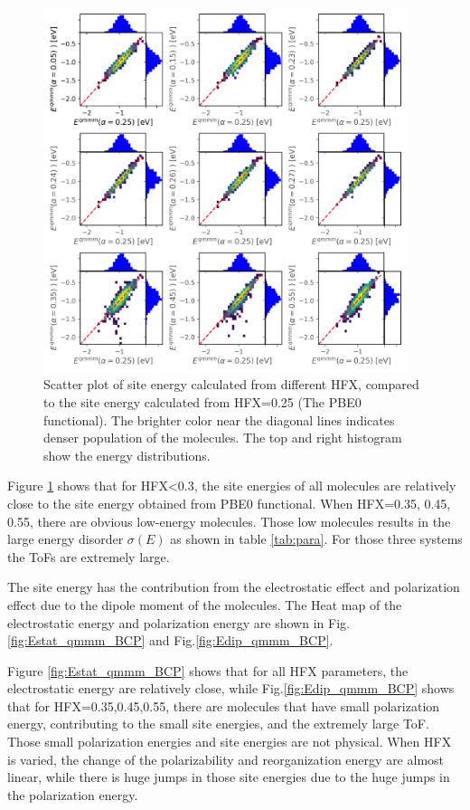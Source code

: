 \documentclass[letterpaper,12pt]{article}
\begin{document}
\begin{figure}[h]
    \centering
    \includegraphics[width=0.95\textwidth]{figs/BCP_HFX/scatterE_qmmm.png}
    \caption{Scatter plot of site energy calculated from different HFX, compared to the site energy calculated from HFX=0.25 (The PBE0 functional). The brighter color near the diagonal lines indicates denser population of the molecules.  The top and right histogram show the energy distributions.}
    \label{fig:E_qmmm_BCP}
\end{figure}

Figure \ref{fig:E_qmmm_BCP} shows that for HFX<0.3, the site energies of all molecules are relatively close to the site energy obtained from PBE0 functional. When HFX=0.35, 0.45, 0.55, there are obvious low-energy molecules. 
Those low molecules results in the large energy disorder $\sigma(E)$ as shown in table \ref{tab:para}. 
For those three systems the ToFs are extremely large. 

The site energy has the contribution from the electrostatic effect and polarization effect due to the dipole moment of the molecules. 
The Heat map of the electrostatic energy and polarization energy are shown in Fig.\ref{fig:Estat_qmmm_BCP} and Fig.\ref{fig:Edip_qmmm_BCP}. 

Figure \ref{fig:Estat_qmmm_BCP} shows that for all HFX parameters, the electrostatic energy are relatively close, while Fig.\ref{fig:Edip_qmmm_BCP} shows that for HFX=0.35,0.45,0.55, there are molecules that have small polarization energy, contributing to the small site energies, and the extremely large ToF. 
Those small polarization energies and site energies are not physical. 
When HFX is varied, the change of the polarizability and reorganization energy are almost linear, while there is huge jumps in those site energies due to the huge jumps in the polarization energy. 
\end{document}
